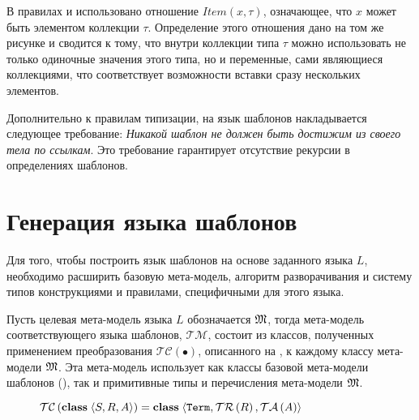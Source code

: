 {В правилах  и  использовано отношение $Item(x,\tau)$, означающее, что $x$ может быть элементом коллекции $\tau$. Определение этого отношения дано на том же рисунке и сводится к тому, что внутри коллекции типа $\tau$ можно использовать не только одиночные значения этого типа, но и переменные, сами являющиеся коллекциями, что соответствует возможности вставки сразу нескольких элементов.


Дополнительно к правилам типизации, на язык шаблонов накладывается следующее требование: 
\emph{Никакой шаблон не должен быть достижим из своего тела по ссылкам}. Это требование гарантирует отсутствие рекурсии в определениях шаблонов.

\section{Генерация языка шаблонов}

\newcommand{\TM}{\mathcal{TM}}
\newcommand{\TC}[1]{\mathcal{TC}\left(#1\right)}
\newcommand{\TR}[1]{\mathcal{TR}\left(#1\right)}
\newcommand{\TA}[1]{\mathcal{TA}\left(#1\right)}

Для того, чтобы построить язык шаблонов на основе заданного языка $L$, необходимо расширить базовую мета-модель, алгоритм разворачивания и систему типов конструкциями и правилами, специфичными для этого языка. 

Пусть целевая мета-модель языка $L$ обозначается $\mathfrak{M}$, тогда мета-модель соответствующего языка шаблонов, $\TM$, состоит из классов, полученных применением преобразования $\TC{\bullet}$, описанного на , к каждому классу мета-модели $\mathfrak{M}$. Эта мета-модель использует как классы базовой мета-модели шаблонов (), так и примитивные типы и перечисления мета-модели $\mathfrak{M}$.

\begin{figure}[htbp]
	\centering
$\TC{\class{}{S}{R}{A}} = \class{}
			{\mathtt{Term}}{\TR{R}}{\TA{A}}$
			

\end{figure}}
